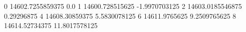 0 14602.7255859375 0.0
1 14600.728515625 -1.9970703125
2 14603.0185546875 0.29296875
4 14608.30859375 5.5830078125
6 14611.9765625 9.2509765625
8 14614.52734375 11.8017578125
